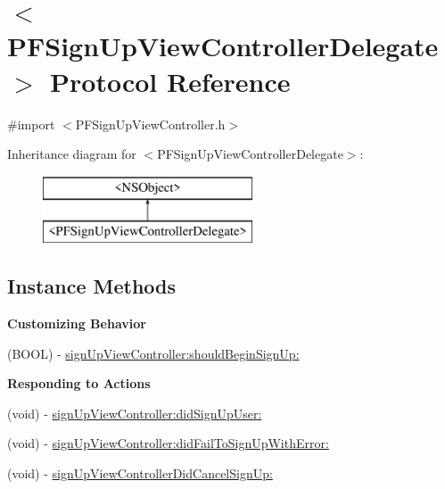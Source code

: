 \hypertarget{protocol_p_f_sign_up_view_controller_delegate-p}{}\section{$<$P\+F\+Sign\+Up\+View\+Controller\+Delegate$>$ Protocol Reference}
\label{protocol_p_f_sign_up_view_controller_delegate-p}


{\ttfamily \#import $<$P\+F\+Sign\+Up\+View\+Controller.\+h$>$}

Inheritance diagram for $<$P\+F\+Sign\+Up\+View\+Controller\+Delegate$>$\+:\begin{figure}[H]
\begin{center}
\leavevmode
\includegraphics[height=2.000000cm]{protocol_p_f_sign_up_view_controller_delegate-p}
\end{center}
\end{figure}
\subsection*{Instance Methods}
\begin{Indent}{\bf Customizing Behavior}\par
{\em 

 

 }\begin{DoxyCompactItemize}
\item 
(B\+O\+O\+L) -\/ \hyperlink{protocol_p_f_sign_up_view_controller_delegate-p_aa3c2936660affd0ae8fbcc500f1f6464}{sign\+Up\+View\+Controller\+:should\+Begin\+Sign\+Up\+:}
\end{DoxyCompactItemize}
\end{Indent}
\begin{Indent}{\bf Responding to Actions}\par
{\em 

 

 }\begin{DoxyCompactItemize}
\item 
(void) -\/ \hyperlink{protocol_p_f_sign_up_view_controller_delegate-p_a0722edf19ebc03788c69506b72e914df}{sign\+Up\+View\+Controller\+:did\+Sign\+Up\+User\+:}
\item 
(void) -\/ \hyperlink{protocol_p_f_sign_up_view_controller_delegate-p_a9d6c6d7583c0f8d4e2837a50475c2f7f}{sign\+Up\+View\+Controller\+:did\+Fail\+To\+Sign\+Up\+With\+Error\+:}
\item 
(void) -\/ \hyperlink{protocol_p_f_sign_up_view_controller_delegate-p_a1e14dd2a7a22f72edd204529a6d6967a}{sign\+Up\+View\+Controller\+Did\+Cancel\+Sign\+Up\+:}
\end{DoxyCompactItemize}
\end{Indent}


